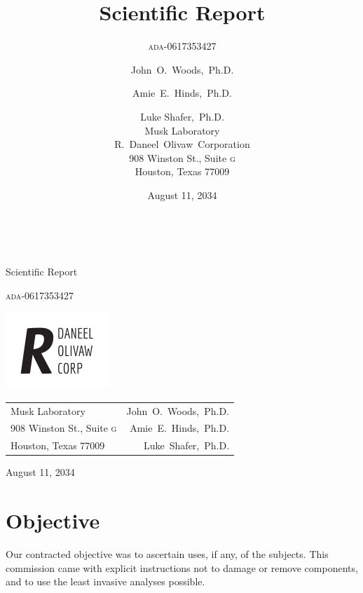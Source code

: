 \documentclass[10pt,twoside,openany]{article}
\title{Scientific Report}
\subtitle{\textsc{ada}-0617353427}
\author{
        John~O.~Woods,~Ph.D. \\
            \and
        Amie~E.~Hinds,~Ph.D. \\
            \and
        Luke Shafer,~Ph.D. \\
        Musk Laboratory\\
        R.~Daneel~Olivaw~Corporation\\
        908 Winston St., Suite \textsc{g} \\
        Houston, Texas 77009
}
\date{August 11, 2034}
\theoremstyle{definition}
\begin{document}
\leavevmode\thispagestyle{empty}\newpage
\begin{titlepage}
\centering
\ \par\vspace{1cm}
{\LARGE Scientific Report \par}
{\Large \textsc{ada}-0617353427 \par}
\vfill
\end{titlepage}
\newpage

\hspace*{-0.46in}\vspace*{-0.25in}
\includegraphics[scale=1.5]{r_daneel_olivaw.pdf}
\begin{table}[H]
\begin{tabularx}{1.0\linewidth}{@{}Xr@{}}
	Musk Laboratory & John~O.~Woods,~Ph.D.\\
        908 Winston St., Suite \textsc{g} & Amie~E.~Hinds,~Ph.D.\\
        Houston, Texas 77009 & Luke~Shafer,~Ph.D.\\
\end{tabularx}
\end{table}
\vspace{1em}
\noindent August 11, 2034
\thispagestyle{empty}
\vfill
\newpage




\section{Objective}
Our contracted objective was to ascertain uses, if any, of the subjects.
This commission came with explicit instructions not to damage or remove components, and to use the least invasive analyses possible.
\end{document}
